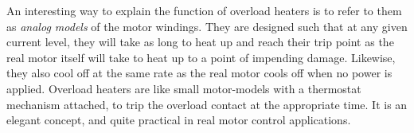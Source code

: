 An interesting way to explain the function of overload heaters is to refer to them as {\it analog models} of the motor windings.  They are designed such that at any given current level, they will take as long to heat up and reach their trip point as the real motor itself will take to heat up to a point of impending damage.  Likewise, they also cool off at the same rate as the real motor cools off when no power is applied.  Overload heaters are like small motor-models with a thermostat mechanism attached, to trip the overload contact at the appropriate time.  It is an elegant concept, and quite practical in real motor control applications.




